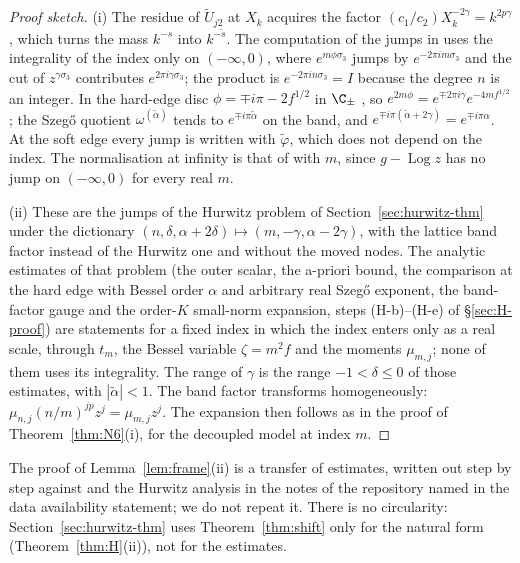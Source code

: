 \begin{proof}[Proof sketch]
(i) The residue of $\tilde U_{j2}$ at $X_k$ acquires the factor $(c_1/c_2)X_k^{-2\gamma}=k^{2p\gamma}$, which turns the mass $k^{-s}$ into
$k^{-\tilde s}$. The computation of the jumps in \cite[Section~5]{PaperII} uses the integrality of the index only on $(-\infty,0)$,
where $e^{m\phi\sigma_3}$ jumps by $e^{-2\pi im\sigma_3}$ and the cut of $z^{\gamma\sigma_3}$ contributes $e^{2\pi i\gamma\sigma_3}$; the
product is $e^{-2\pi in\sigma_3}=I$ because the degree $n$ is an integer. In the hard-edge disc $\phi=\mp i\pi-2f^{1/2}$ in $\C_\pm$
\cite{PaperII}, so $e^{2m\phi}=e^{\mp2\pi i\gamma}e^{-4m f^{1/2}}$; the Szeg\H{o} quotient $\omega^{(\tilde\alpha)}$ tends to
$e^{\mp i\pi\tilde\alpha}$ on the band, and $e^{\mp i\pi(\tilde\alpha+2\gamma)}=e^{\mp i\pi\alpha}$. At the soft edge every jump is written
with $\tilde\varphi$, which does not depend on the index. The normalisation at infinity is that of \cite{PaperII} with $m$, since
$g-\operatorname{Log}z$ has no jump on $(-\infty,0)$ for every real $m$.

(ii) These are the jumps of the Hurwitz problem of Section~\ref{sec:hurwitz-thm} under the dictionary
$(n,\delta,\alpha+2\delta)\mapsto(m,-\gamma,\alpha-2\gamma)$, with the lattice band factor instead of the Hurwitz one and without the
moved nodes. The analytic estimates of that problem (the outer scalar, the a-priori bound, the comparison at the hard edge with
Bessel order $\alpha$ and arbitrary real Szeg\H{o} exponent, the band-factor gauge and the order-$K$ small-norm expansion, steps
(H-b)--(H-e) of \S\ref{sec:H-proof}) are statements for a fixed index in which the index enters only as a real scale, through
$t_m$, the Bessel variable $\zeta=m^2f$ and the moments $\mu_{m,j}$; none of them uses its integrality. The range of $\gamma$ is the
range $-1<\delta\le0$ of those estimates, with $|\tilde\alpha|<1$. The band factor transforms homogeneously:
$\mu_{n,j}(n/m)^{jp}z^j=\mu_{m,j}z^j$. The expansion then follows as in the proof of Theorem~\ref{thm:N6}(i), for the decoupled model at index $m$.
\end{proof}

The proof of Lemma~\ref{lem:frame}(ii) is a transfer of estimates, written out step by step against \cite{PaperII} and the
Hurwitz analysis in the notes of the repository named in the data availability statement; we do not repeat it. There is no
circularity: Section~\ref{sec:hurwitz-thm} uses Theorem~\ref{thm:shift} only for the natural form (Theorem~\ref{thm:H}(ii)), not
for the estimates.

